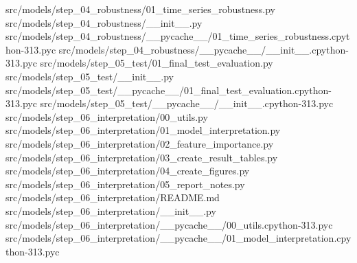 \documentclass[
  11pt,
  a4paper]{article}
\newenvironment{Shaded}{}{}
\newcommand{\NormalTok}[1]{#1}
\begin{document}
\begin{Shaded}
\begin{Highlighting}[]
\NormalTok{src/models/step\_\allowbreak{}04\_\allowbreak{}robustness/01\_\allowbreak{}time\_\allowbreak{}series\_\allowbreak{}robustness.py}
\NormalTok{src/models/step\_\allowbreak{}04\_\allowbreak{}robustness/\_\allowbreak{}\_\allowbreak{}init\_\allowbreak{}\_\allowbreak{}.py}
\NormalTok{src/models/step\_\allowbreak{}04\_\allowbreak{}robustness/\_\allowbreak{}\_\allowbreak{}pycache\_\allowbreak{}\_\allowbreak{}/01\_\allowbreak{}time\_\allowbreak{}series\_\allowbreak{}robustness.cpython{-}313.pyc}
\NormalTok{src/models/step\_\allowbreak{}04\_\allowbreak{}robustness/\_\allowbreak{}\_\allowbreak{}pycache\_\allowbreak{}\_\allowbreak{}/\_\allowbreak{}\_\allowbreak{}init\_\allowbreak{}\_\allowbreak{}.cpython{-}313.pyc}
\NormalTok{src/models/step\_\allowbreak{}05\_\allowbreak{}test/01\_\allowbreak{}final\_\allowbreak{}test\_\allowbreak{}evaluation.py}
\NormalTok{src/models/step\_\allowbreak{}05\_\allowbreak{}test/\_\allowbreak{}\_\allowbreak{}init\_\allowbreak{}\_\allowbreak{}.py}
\NormalTok{src/models/step\_\allowbreak{}05\_\allowbreak{}test/\_\allowbreak{}\_\allowbreak{}pycache\_\allowbreak{}\_\allowbreak{}/01\_\allowbreak{}final\_\allowbreak{}test\_\allowbreak{}evaluation.cpython{-}313.pyc}
\NormalTok{src/models/step\_\allowbreak{}05\_\allowbreak{}test/\_\allowbreak{}\_\allowbreak{}pycache\_\allowbreak{}\_\allowbreak{}/\_\allowbreak{}\_\allowbreak{}init\_\allowbreak{}\_\allowbreak{}.cpython{-}313.pyc}
\NormalTok{src/models/step\_\allowbreak{}06\_\allowbreak{}interpretation/00\_\allowbreak{}utils.py}
\NormalTok{src/models/step\_\allowbreak{}06\_\allowbreak{}interpretation/01\_\allowbreak{}model\_\allowbreak{}interpretation.py}
\NormalTok{src/models/step\_\allowbreak{}06\_\allowbreak{}interpretation/02\_\allowbreak{}feature\_\allowbreak{}importance.py}
\NormalTok{src/models/step\_\allowbreak{}06\_\allowbreak{}interpretation/03\_\allowbreak{}create\_\allowbreak{}result\_\allowbreak{}tables.py}
\NormalTok{src/models/step\_\allowbreak{}06\_\allowbreak{}interpretation/04\_\allowbreak{}create\_\allowbreak{}figures.py}
\NormalTok{src/models/step\_\allowbreak{}06\_\allowbreak{}interpretation/05\_\allowbreak{}report\_\allowbreak{}notes.py}
\NormalTok{src/models/step\_\allowbreak{}06\_\allowbreak{}interpretation/README.md}
\NormalTok{src/models/step\_\allowbreak{}06\_\allowbreak{}interpretation/\_\allowbreak{}\_\allowbreak{}init\_\allowbreak{}\_\allowbreak{}.py}
\NormalTok{src/models/step\_\allowbreak{}06\_\allowbreak{}interpretation/\_\allowbreak{}\_\allowbreak{}pycache\_\allowbreak{}\_\allowbreak{}/00\_\allowbreak{}utils.cpython{-}313.pyc}
\NormalTok{src/models/step\_\allowbreak{}06\_\allowbreak{}interpretation/\_\allowbreak{}\_\allowbreak{}pycache\_\allowbreak{}\_\allowbreak{}/01\_\allowbreak{}model\_\allowbreak{}interpretation.cpython{-}313.pyc}

\end{Highlighting}
\end{Shaded}
\end{document}
